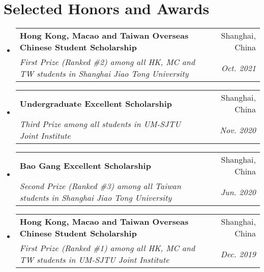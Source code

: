 \documentclass[letterpaper,10.8pt]{article}
\makeatletter
\newcommand{\resumeSubheading}[4]{
  \vspace{-1pt}\item
    \begin{tabular*}{0.97\textwidth}{l@{\extracolsep{\fill}}r}
      \textbf{#1} & #2 \\
      \textit{\small#3} & \textit{\small #4} \\
    \end{tabular*}\vspace{-5pt}
}
\newcommand{\resumeSubHeadingListStart}{\begin{itemize}[leftmargin=*]}
\newcommand{\resumeSubHeadingListEnd}{\end{itemize}}
\makeatother
\begin{document}
\section{Selected Honors and Awards}
\resumeSubHeadingListStart

\resumeSubheading
{Hong Kong, Macao and Taiwan Overseas Chinese Student Scholarship}{Shanghai, China}
{First Prize (Ranked \#2) among all HK, MC and TW students in \emph{Shanghai Jiao Tong University}}{Oct. 2021}

\resumeSubheading
{Undergraduate Excellent Scholarship}{Shanghai, China}
{Third Prize among all students in \emph{UM-SJTU Joint Institute}}{Nov. 2020}

\resumeSubheading
{Bao Gang Excellent Scholarship}{Shanghai, China}
{Second Prize (Ranked \#3) among all Taiwan students in \emph{Shanghai Jiao Tong University}}{Jun. 2020}

\resumeSubheading
{Hong Kong, Macao and Taiwan Overseas Chinese Student Scholarship}{Shanghai, China}
{First Prize (Ranked \#1) among all HK, MC and TW students in \emph{UM-SJTU Joint Institute}}{Dec. 2019}

\resumeSubHeadingListEnd
\end{document}
